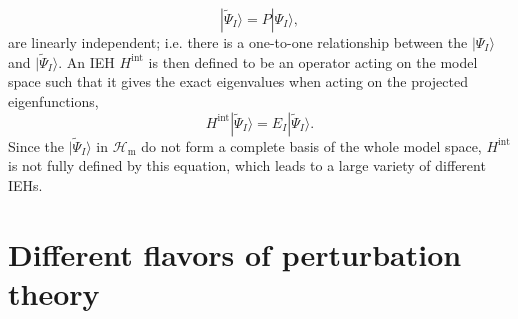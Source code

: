 	\begin{equation}
	|{\tilde \Psi _I}\rangle  = {P}|{\Psi _I}\rangle, 
	\end{equation}
are linearly independent; i.e. there is a one-to-one relationship between the $|{\Psi _I}\rangle $ and $|{\tilde \Psi _I}\rangle $. 
An IEH ${H^{\text{int} }}$ is then defined to be an operator acting on the model space such that it gives the exact eigenvalues when acting on the projected eigenfunctions,
	\begin{equation}
	{H^{\text{int} }}|{\tilde \Psi _I}\rangle  = {E_I}|{\tilde \Psi _I}\rangle. 
	\end{equation}
Since the $|{\tilde \Psi _I}\rangle $ in ${\mathcal{H}_\text{m} }$ do not form a complete basis of the whole model space, ${H^{{\text{int}}}}$ is not fully defined by this equation, which leads to a large variety of different IEHs.

\section{Different flavors of perturbation theory}

